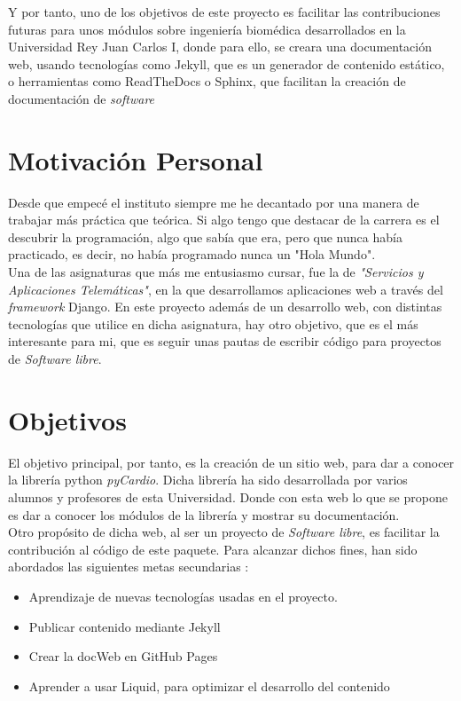 \documentclass[a4paper, 12pt]{book}
\begin{document}
Y por tanto, uno de los objetivos de este proyecto es facilitar las contribuciones futuras para unos módulos sobre ingeniería biomédica desarrollados en la Universidad Rey Juan Carlos I, donde para ello, se creara una documentación web, usando tecnologías como Jekyll, que es un generador de contenido estático, o herramientas como ReadTheDocs o Sphinx, que facilitan la creación de documentación de \emph{software} 


\section{Motivación Personal}
\label{sec:mot}
Desde que empecé el instituto siempre me he decantado por una manera de trabajar más práctica que teórica. Si algo tengo que destacar de la carrera es el descubrir la programación, algo que sabía que era, pero que nunca había practicado, es decir, no había programado nunca un "Hola Mundo". \\
Una de las asignaturas que más me entusiasmo cursar, fue la de \emph{"Servicios y Aplicaciones Telemáticas"}, en la que desarrollamos aplicaciones web a través del \emph{framework} Django. En este proyecto además de un desarrollo web, con distintas tecnologías que utilice en dicha asignatura, hay otro objetivo, que es el más interesante para mi, que es seguir unas pautas de escribir código para proyectos de \emph{Software libre}.

\section{Objetivos}
\label{sec:objetivos}
El objetivo principal, por tanto, es la creación de un sitio web, para dar a conocer la librería python \emph{pyCardio}. Dicha librería ha sido desarrollada por varios alumnos y profesores de esta Universidad. Donde con esta web lo que se propone es dar a conocer los módulos de la librería y mostrar su documentación. \\
Otro propósito de dicha web, al ser un proyecto de \emph{Software libre}, es facilitar la contribución al código de este paquete. Para alcanzar dichos fines, han sido abordados las siguientes metas secundarias :
\begin{itemize}
    \item Aprendizaje de nuevas tecnologías usadas en el proyecto.
    \item Publicar contenido mediante Jekyll 
    \item Crear la docWeb en GitHub Pages
    \item Aprender a usar Liquid, para optimizar el desarrollo del contenido
\end{itemize}
\end{document}
